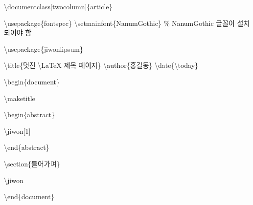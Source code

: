 \documentclass[
  letterpaper,
]{book}
\newenvironment{Shaded}{\begin{snugshade}}{\end{snugshade}}
\newcommand{\BuiltInTok}[1]{\textcolor[rgb]{0.00,0.23,0.31}{#1}}
\newcommand{\CommentTok}[1]{\textcolor[rgb]{0.37,0.37,0.37}{#1}}
\newcommand{\ExtensionTok}[1]{\textcolor[rgb]{0.00,0.23,0.31}{#1}}
\newcommand{\FunctionTok}[1]{\textcolor[rgb]{0.28,0.35,0.67}{#1}}
\newcommand{\KeywordTok}[1]{\textcolor[rgb]{0.00,0.23,0.31}{#1}}
\newcommand{\NormalTok}[1]{\textcolor[rgb]{0.00,0.23,0.31}{#1}}
\begin{document}
\begin{Shaded}
\begin{Highlighting}[]
\BuiltInTok{\textbackslash{}documentclass}\NormalTok{[twocolumn]\{}\ExtensionTok{article}\NormalTok{\}}

\BuiltInTok{\textbackslash{}usepackage}\NormalTok{\{}\ExtensionTok{fontspec}\NormalTok{\}}
\FunctionTok{\textbackslash{}setmainfont}\NormalTok{\{NanumGothic\} }\CommentTok{\% NanumGothic 글꼴이 설치되어야 함}

\BuiltInTok{\textbackslash{}usepackage}\NormalTok{\{}\ExtensionTok{jiwonlipsum}\NormalTok{\}}

\FunctionTok{\textbackslash{}title}\NormalTok{\{멋진 }\FunctionTok{\textbackslash{}LaTeX}\NormalTok{ 제목 페이지\}}
\FunctionTok{\textbackslash{}author}\NormalTok{\{홍길동\}}
\FunctionTok{\textbackslash{}date}\NormalTok{\{}\FunctionTok{\textbackslash{}today}\NormalTok{\}}

\KeywordTok{\textbackslash{}begin}\NormalTok{\{}\ExtensionTok{document}\NormalTok{\}}

\FunctionTok{\textbackslash{}maketitle}

\KeywordTok{\textbackslash{}begin}\NormalTok{\{}\ExtensionTok{abstract}\NormalTok{\}}

\FunctionTok{\textbackslash{}jiwon}\NormalTok{[1]}

\KeywordTok{\textbackslash{}end}\NormalTok{\{}\ExtensionTok{abstract}\NormalTok{\}}

\KeywordTok{\textbackslash{}section}\NormalTok{\{들어가며\}}

\FunctionTok{\textbackslash{}jiwon}

\KeywordTok{\textbackslash{}end}\NormalTok{\{}\ExtensionTok{document}\NormalTok{\}}
\end{Highlighting}
\end{Shaded}
\end{document}
